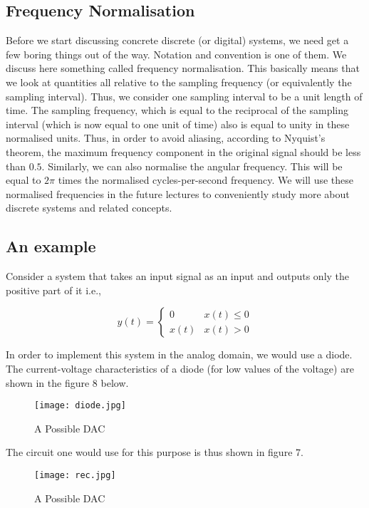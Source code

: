 \subsection{Frequency Normalisation}
Before we start discussing concrete discrete (or digital) systems, we need get a few boring things out of the way. Notation and convention is one of them. We discuss here something called frequency normalisation. This basically means that we look at quantities all relative to the sampling frequency (or equivalently the sampling interval). Thus, we consider one sampling interval to be a unit length of time. The sampling frequency, which is equal to the reciprocal of the sampling interval (which is now equal to one unit of time) also is equal to unity in these normalised units. Thus, in order to avoid aliasing, according to Nyquist's theorem, the maximum frequency component in the original signal should be less than $0.5$. Similarly, we can also normalise the angular frequency. This will be equal to $2\pi$ times the normalised cycles-per-second frequency. We will use these normalised frequencies in the future lectures to conveniently study more about discrete systems and related concepts.

\subsection*{An example}

Consider a system that takes an input signal as an input and outputs only the positive part of it i.e.,

\[ y(t) = \begin{cases} 
      0 & x(t)\leq 0 \\
      x(t) & x(t) > 0
   \end{cases}
\]


In order to implement this system in the analog domain, we would use a diode. The current-voltage characteristics of a diode (for low values of the voltage) are shown in the figure 8 below.

\begin{figure}[H]
    \centering
    \texttt{[image: diode.jpg]}
    \caption{A Possible DAC}
\end{figure}

The circuit one would use for this purpose is thus shown in figure 7. 

\begin{figure}[H]
    \texttt{[image: rec.jpg]}
    \caption{A Possible DAC}
\end{figure}

